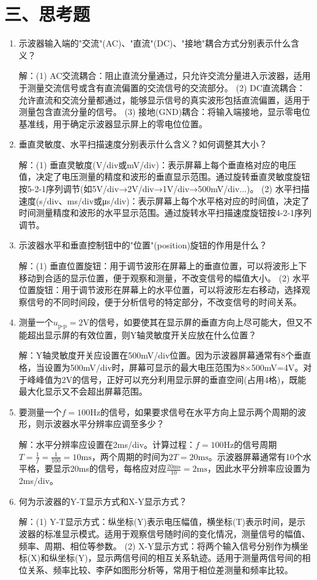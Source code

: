 \documentclass[12pt,a4paper]{article}
\begin{document}
\section*{三、思考题}
\begin{enumerate}
    \item 示波器输入端的"交流"(AC)、"直流"(DC)、"接地"耦合方式分别表示什么含义？
    
    解：(1) AC交流耦合：阻止直流分量通过，只允许交流分量进入示波器，适用于测量交流信号或含有直流偏置的交流信号的交流部分。
    (2) DC直流耦合：允许直流和交流分量都通过，能够显示信号的真实波形包括直流偏置，适用于测量包含直流分量的信号。
    (3) 接地(GND)耦合：将输入端接地，显示零电位基准线，用于确定示波器显示屏上的零电位位置。
    
    \item 垂直灵敏度、水平扫描速度分别表示什么含义？如何调整其大小？
    
    解：(1) 垂直灵敏度(V/div或mV/div)：表示屏幕上每个垂直格对应的电压值，决定了电压测量的精度和波形的垂直显示范围。通过旋转垂直灵敏度旋钮按5-2-1序列调节(如5V/div→2V/div→1V/div→500mV/div...)。
    (2) 水平扫描速度(s/div、ms/div或μs/div)：表示屏幕上每个水平格对应的时间值，决定了时间测量精度和波形的水平显示范围。通过旋转水平扫描速度旋钮按4-2-1序列调节。
    
    \item 示波器水平和垂直控制钮中的"位置"(position)旋钮的作用是什么？
    
    解：(1) 垂直位置旋钮：用于调节波形在屏幕上的垂直位置，可以将波形上下移动到合适的显示位置，便于观察和测量，不改变信号的幅值大小。
    (2) 水平位置旋钮：用于调节波形在屏幕上的水平位置，可以将波形左右移动，选择观察信号的不同时间段，便于分析信号的特定部分，不改变信号的时间关系。
    
    \item 测量一个$u_{\text{p-p}}=2\text{V}$的信号，如要使其在显示屏的垂直方向上尽可能大，但又不能超出显示屏的有效位置，则Y轴灵敏度开关应放在什么位置？
    
    解：Y轴灵敏度开关应设置在500mV/div位置。因为示波器屏幕通常有8个垂直格，当设置为500mV/div时，屏幕可显示的最大电压范围为8×500mV=4V。对于峰峰值为2V的信号，正好可以充分利用显示屏的垂直空间(占用4格)，既能最大化显示又不会超出屏幕范围。
    
    \item 要测量一个$f=100\text{Hz}$的信号，如果要求信号在水平方向上显示两个周期的波形，则示波器水平分辨率应调至多少？
    
    解：水平分辨率应设置在2ms/div。计算过程：$f=100\text{Hz}$的信号周期$T=\frac{1}{f}=\frac{1}{100}=10\text{ms}$，两个周期的时间为$2T=20\text{ms}$。示波器屏幕通常有10个水平格，要显示20ms的信号，每格应对应$\frac{20\text{ms}}{10}=2\text{ms}$，因此水平分辨率应设置为2ms/div。
    
    \item 何为示波器的Y-T显示方式和X-Y显示方式？
    
    解：(1) Y-T显示方式：纵坐标(Y)表示电压幅值，横坐标(T)表示时间，是示波器的标准显示模式。适用于观察信号随时间的变化情况，测量信号的幅值、频率、周期、相位等参数。
    (2) X-Y显示方式：将两个输入信号分别作为横坐标(X)和纵坐标(Y)，显示两信号间的相互关系轨迹。适用于测量两信号间的相位关系、频率比较、李萨如图形分析等，常用于相位差测量和频率比较。
\end{enumerate}
\end{document}
